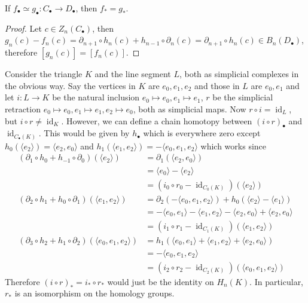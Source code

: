 \begin{lemma}
    If $f_\bullet\simeq g_\bullet:C_\bullet\to D_\bullet$, then $f_\ast=g_\ast$.
\end{lemma}
\begin{proof}
    Let $c\in Z_n(C_\bullet)$, then $g_n(c)-f_n(c)=\partial_{n+1}\circ h_n(c)+h_{n-1}\circ\partial_n(c)=\partial_{n+1}\circ h_n(c)\in B_n(D_\bullet)$, therefore $[g_n(c)]=[f_n(c)]$.
\end{proof}
\begin{example}
    Consider the triangle $K$ and the line segment $L$, both as simplicial complexes in the obvious way.
    Say the vertices in $K$ are $e_0,e_1,e_2$ and those in $L$ are $e_0,e_1$ and let $i:L\to K$ be the natural inclusion $e_0\mapsto e_0,e_1\mapsto e_1$, $r$ be the simplicial retraction $e_0\mapsto e_0,e_1\mapsto e_1,e_2\mapsto e_0$, both as simplicial maps.
    Now $r\circ i=\operatorname{id}_L$, but $i\circ r\neq \operatorname{id}_K$.
    However, we can define a chain homotopy between $(i\circ r)_\bullet$ and $\operatorname{id}_{C_\bullet(K)}$.
    This would be given by $h_\bullet$ which is everywhere zero except $h_0(\langle e_2\rangle)=\langle e_2,e_0\rangle$ and $h_1(\langle e_1,e_2\rangle)=-\langle e_0,e_1,e_2\rangle$ which works since
    \begin{align*}
        (\partial_1\circ h_0+h_{-1}\circ\partial_0)(\langle e_2\rangle)&=\partial_1(\langle e_2,e_0\rangle)\\
        &=\langle e_0\rangle-\langle e_2\rangle\\
        &=(i_0\circ r_0-\operatorname{id}_{C_0(K)})(\langle e_2\rangle)\\
        (\partial_2\circ h_1+h_0\circ\partial_1)(\langle e_1,e_2\rangle)&=\partial_2(-\langle e_0,e_1,e_2\rangle)+h_0(\langle e_2\rangle-\langle e_1\rangle)\\
        &=-\langle e_0,e_1\rangle-\langle e_1,e_2\rangle-\langle e_2,e_0\rangle+\langle e_2,e_0\rangle\\
        &=(i_1\circ r_1-\operatorname{id}_{C_1(K)})(\langle e_1,e_2\rangle)\\
        (\partial_3\circ h_2+h_1\circ\partial_2)(\langle e_0,e_1,e_2\rangle)&=h_1(\langle e_0,e_1\rangle+\langle e_1,e_2\rangle+\langle e_2,e_0\rangle)\\
        &=-\langle e_0,e_1,e_2\rangle\\
        &=(i_2\circ r_2-\operatorname{id}_{C_2(K)})(\langle e_0,e_1,e_2\rangle)
    \end{align*}
    Therefore $(i\circ r)_\ast=i_\ast\circ r_\ast$ would just be the identity on $H_n(K)$.
    In particular, $r_\ast$ is an isomorphism on the homology groups.
\end{example}

